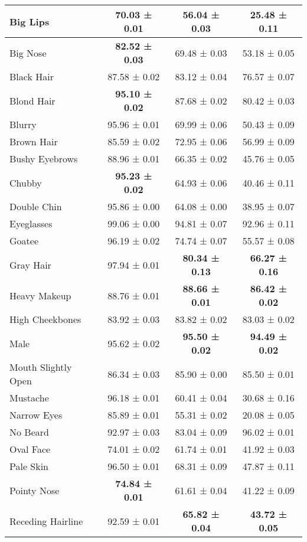 \begin{table*}[h]
\begin{center}
\begin{small}
{\begin{tabular}{|l|c|c|c|}
Big Lips           & 70.03 ± 0.01 & 56.04 ± 0.03 & 25.48 ± 0.11 \\ \hline
Big Nose           & \textbf{82.52 ± 0.03} & 69.48 ± 0.03 & 53.18 ± 0.05 \\ \hline
Black Hair         & 87.58 ± 0.02 & 83.12 ± 0.04 & 76.57 ± 0.07 \\ \hline
Blond Hair         & \textbf{95.10 ± 0.02} & 87.68 ± 0.02 & 80.42 ± 0.03 \\ \hline
Blurry             & 95.96 ± 0.01 & 69.99 ± 0.06 & 50.43 ± 0.09 \\ \hline
Brown Hair         & 85.59 ± 0.02 & 72.95 ± 0.06 & 56.99 ± 0.09 \\ \hline
Bushy Eyebrows     & 88.96 ± 0.01 & 66.35 ± 0.02 & 45.76 ± 0.05 \\ \hline
Chubby             & \textbf{95.23 ± 0.02} & 64.93 ± 0.06 & 40.46 ± 0.11 \\ \hline
Double Chin        & 95.86 ± 0.00 & 64.08 ± 0.00 & 38.95 ± 0.07 \\ \hline
Eyeglasses         & 99.06 ± 0.00 & 94.81 ± 0.07 & 92.96 ± 0.11 \\ \hline
Goatee             & 96.19 ± 0.02 & 74.74 ± 0.07 & 55.57 ± 0.08 \\ \hline
Gray Hair          & 97.94 ± 0.01 & \textbf{80.34 ± 0.13} & \textbf{66.27 ± 0.16} \\ \hline
Heavy Makeup       & 88.76 ± 0.01 & \textbf{88.66 ± 0.01} & \textbf{86.42 ± 0.02} \\ \hline
High Cheekbones    & 83.92 ± 0.03 & 83.82 ± 0.02 & 83.03 ± 0.02 \\ \hline
Male               & 95.62 ± 0.02 & \textbf{95.50 ± 0.02} & \textbf{94.49 ± 0.02} \\ \hline
Mouth Slightly Open& 86.34 ± 0.03 & 85.90 ± 0.00 & 85.50 ± 0.01 \\ \hline
Mustache           & 96.18 ± 0.01 & 60.41 ± 0.04 & 30.68 ± 0.16 \\ \hline
Narrow Eyes        & 85.89 ± 0.01 & 55.31 ± 0.02 & 20.08 ± 0.05 \\ \hline
No Beard           & 92.97 ± 0.03 & 83.04 ± 0.09 & 96.02 ± 0.01 \\ \hline
Oval Face          & 74.01 ± 0.02 & 61.74 ± 0.01 & 41.92 ± 0.03 \\ \hline
Pale Skin          & 96.50 ± 0.01 & 68.31 ± 0.09 & 47.87 ± 0.11 \\ \hline
Pointy Nose        & \textbf{74.84 ± 0.01} & 61.61 ± 0.04 & 41.22 ± 0.09 \\ \hline
Receding Hairline  & 92.59 ± 0.01 & \textbf{65.82 ± 0.04} & \textbf{43.72 ± 0.05} \\ \hline

\end{tabular}}
\end{small}
\end{center}
\end{table*}
